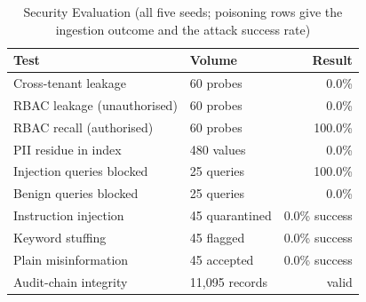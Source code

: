\begin{table}[!htbp]
\centering
\caption{Security Evaluation (all five seeds; poisoning rows give the ingestion outcome and the attack success rate)}
\label{tab:security}
\footnotesize
\begin{tabular*}{\columnwidth}{@{\extracolsep{\fill}}llr@{}}
\toprule
Test & Volume & Result \\
\midrule
Cross-tenant leakage & 60 probes & 0.0\% \\
RBAC leakage (unauthorised) & 60 probes & 0.0\% \\
RBAC recall (authorised) & 60 probes & 100.0\% \\
PII residue in index & 480 values & 0.0\% \\
Injection queries blocked & 25 queries & 100.0\% \\
Benign queries blocked & 25 queries & 0.0\% \\
\midrule
Instruction injection & 45 quarantined & 0.0\% success \\
Keyword stuffing & 45 flagged & 0.0\% success \\
Plain misinformation & 45 accepted & 0.0\% success \\
Audit-chain integrity & 11,095 records & valid \\
\bottomrule
\end{tabular*}
\end{table}
